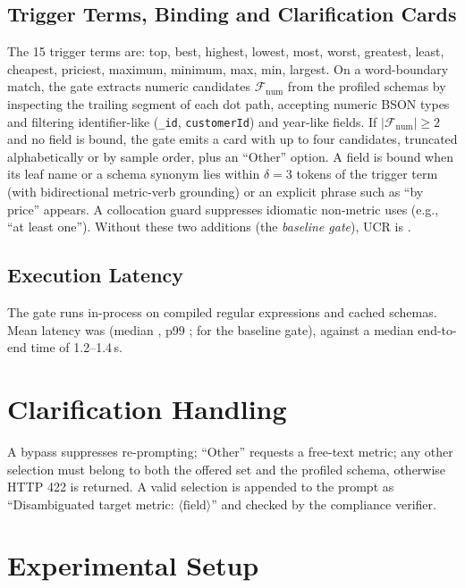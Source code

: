 \subsection{Trigger Terms, Binding and Clarification Cards}
The 15 trigger terms are: top, best, highest, lowest, most, worst, greatest, least, cheapest, priciest, maximum, minimum, max, min, largest. On a word-boundary match, the gate extracts numeric candidates $\mathcal{F}_{\text{num}}$ from the profiled schemas by inspecting the trailing segment of each dot path, accepting numeric BSON types and filtering identifier-like (\texttt{\_id}, \texttt{customerId}) and year-like fields. If $|\mathcal{F}_{\text{num}}| \ge 2$ and no field is bound, the gate emits a card with up to four candidates, truncated alphabetically or by sample order, plus an ``Other'' option. A field is bound when its leaf name or a schema synonym lies within $\delta{=}3$ tokens of the trigger term (with bidirectional metric-verb grounding) or an explicit phrase such as ``by price'' appears. A collocation guard suppresses idiomatic non-metric uses (e.g., ``at least one''). Without these two additions (the \emph{baseline gate}), UCR is \gateBaseUCR{}.

\subsection{Execution Latency}
The gate runs in-process on compiled regular expressions and cached schemas. Mean latency was \gateLatencyMean{} (median \gateLatencyPFifty{}, p99 \gateLatencyPNineNine{}; \gateBaseLatencyMean{} for the baseline gate), against a median end-to-end time of 1.2--1.4\,s.

\section{Clarification Handling}
\label{sec:safety}
A bypass suppresses re-prompting; ``Other'' requests a free-text metric; any other selection must belong to both the offered set and the profiled schema, otherwise HTTP 422 is returned. A valid selection is appended to the prompt as ``Disambiguated target metric: $\langle\text{field}\rangle$'' and checked by the compliance verifier.

\section{Experimental Setup}
\label{sec:setup}

